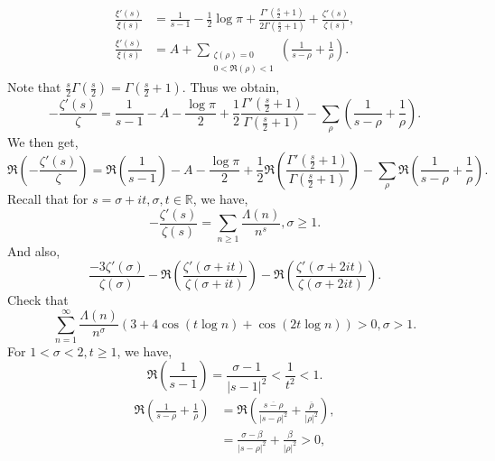 \documentclass{article}
\newcommand{\R}[0]{\mathbb{R}}
\begin{document}
\begin{align*}
  {\frac {\xi'(s)} {\xi(s)}} & = {\frac 1 {s-1}}-{\frac 1 2}\log\pi + {\frac {\Gamma'\left({\frac s 2}+1\right)} {2\Gamma\left({\frac s 2}+1\right)}}+{\frac {\zeta'(s)} {\zeta(s)}},\\
  {\frac {\xi'(s)} {\xi(s)}} & = A+\sum_{\substack{\zeta(\rho)=0\\0<\Re(\rho)<1}}\left({\frac 1 {s-\rho}}+{\frac 1 \rho}\right).
\end{align*}
Note that ${\frac s 2}\Gamma\left({\frac s 2}\right)=\Gamma\left({\frac s 2}+1\right)$. Thus we obtain,
\begin{equation*}
  -{\frac {\zeta'(s)} {\zeta}} = {\frac 1 {s-1}}-A-{\frac {\log\pi} 2}+{\frac 1 2}{\frac {\Gamma'\left({\frac s 2}+1\right)} {\Gamma\left({\frac s 2}+1\right)}}-\sum_{\rho}\left({\frac 1 {s-\rho}}+{\frac 1 \rho}\right).
\end{equation*}
We then get,
\begin{equation*}
  \Re\left(-{\frac {\zeta'(s)} {\zeta}}\right) = \Re\left({\frac 1 {s-1}}\right)-A-{\frac {\log\pi} 2}+{\frac 1 2}\Re\left({\frac {\Gamma'\left({\frac s 2}+1\right)} {\Gamma\left({\frac s 2}+1\right)}}\right)-\sum_{\rho}\Re\left({\frac 1 {s-\rho}}+{\frac 1 \rho}\right).
\end{equation*}
Recall that for $s=\sigma+it,\sigma,t\in\R$, we have,
\begin{equation*}
  -{\frac {\zeta'(s)} {\zeta(s)}} = \sum_{n\geq 1}{\frac {\Lambda(n)} {n^s}}, \sigma\geq1.
\end{equation*}
And also,
\begin{equation*}
  {\frac {-3\zeta'(\sigma)} {\zeta(\sigma)}} - \Re\left({\frac {\zeta'(\sigma+it)} {\zeta(\sigma+it)}}\right)-\Re\left({\frac{\zeta'(\sigma+2it)} {\zeta(\sigma+2it)}}\right).
\end{equation*}
Check that 
\begin{equation*}
  \sum_{n=1}^\infty {\frac {\Lambda(n)} {n^\sigma}}(3+4\cos(t\log n)+\cos(2t\log n))>0,\sigma>1.
\end{equation*}
For $1<\sigma<2,t\geq1$, we have,
\begin{equation*}
  \Re\left({\frac 1 {s-1}}\right) = {\frac {\sigma-1} {\vert s-1\vert^2}} <{\frac 1 {t^2}}<1.
\end{equation*}
\begin{align*}
  \Re\left({\frac 1 {s-\rho}}+{\frac 1 \rho}\right) & = \Re\left({\frac {\overline{s-\rho}} {\vert s-\rho\vert^2}}+{\frac {\overline{\rho}} {\vert\rho\vert^2}}\right),\\
  & = {\frac {\sigma-\beta} {\vert s-\rho\vert^2}}+{\frac \beta {\vert \rho\vert^2}}>0,
\end{align*}
\end{document}
